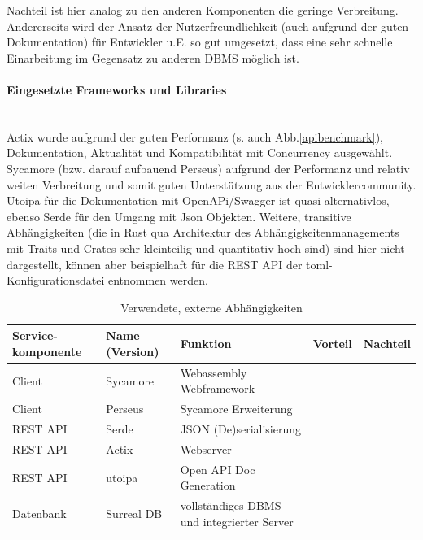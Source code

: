 \documentclass[notitlepage, hidelinks]{article}
\begin{document}
Nachteil ist hier analog zu den anderen Komponenten die geringe Verbreitung. Andererseits wird der Ansatz der Nutzerfreundlichkeit (auch aufgrund der guten Dokumentation) für Entwickler u.E. so gut umgesetzt, dass eine sehr schnelle Einarbeitung im Gegensatz zu anderen DBMS möglich ist.

\paragraph{Eingesetzte Frameworks und Libraries} \mbox{} \\
Actix wurde aufgrund der guten Performanz (s. auch Abb.\ref{apibenchmark}), Dokumentation, Aktualität und Kompatibilität mit Concurrency ausgewählt. Sycamore (bzw. darauf aufbauend Perseus) aufgrund der Performanz und relativ weiten Verbreitung und somit guten Unterstützung aus der Entwicklercommunity. Utoipa für die Dokumentation mit OpenAPi/Swagger ist quasi alternativlos, ebenso Serde für den Umgang mit Json Objekten. Weitere, transitive Abhängigkeiten (die in Rust qua Architektur des Abhängigkeitenmanagements mit Traits und Crates sehr kleinteilig und quantitativ hoch sind) sind hier nicht dargestellt, können aber beispielhaft für die REST API der toml- Konfigurationsdatei entnommen werden.

\begin{table}[H]
\begin{center}
\begin{tabular}{| L{2cm} | L{2cm} | L{3.2cm} | L{3.2cm} | L{3.2cm} |}
\hline
Service- komponente & Name (Version) & Funktion & Vorteil & Nachteil \\ \hline
Client & Sycamore & Webassembly Webframework & & \\ \hline
Client & Perseus & Sycamore Erweiterung & & \\ \hline
REST API & Serde & JSON (De)serialisierung & & \\ \hline
REST API & Actix & Webserver & & \\ \hline
REST API & utoipa & Open API Doc Generation & & \\ \hline
Datenbank & Surreal DB & vollständiges DBMS und integrierter Server & & \\ \hline 
\end{tabular}
\caption{Verwendete, externe Abhängigkeiten}
\label{dependencies}
\end{center}
\end{table}
\end{document}
